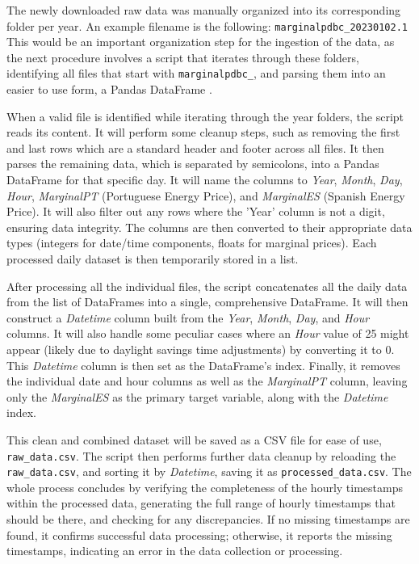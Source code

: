 \documentclass[12pt]{report} %
\begin{document}
The newly downloaded raw data was manually organized into its corresponding folder per year. An example filename is the following: \small{\verb|marginalpdbc_20230102.1|} This would be an important organization step for the ingestion of the data, as the next procedure involves a script that iterates through these folders, identifying all files that start with \small{\verb|marginalpdbc_|}, and parsing them into an easier to use form, a Pandas DataFrame \cite{dataframe}.

When a valid file is identified while iterating through the year folders, the script reads its content. It will perform some cleanup steps, such as removing the first and last rows which are a standard header and footer across all files. It then parses the remaining data, which is separated by semicolons, into a Pandas DataFrame for that specific day. It will name the columns to \textit{Year}, \textit{Month}, \textit{Day}, \textit{Hour}, \textit{MarginalPT} (Portuguese Energy Price), and \textit{MarginalES} (Spanish Energy Price). It will also filter out any rows where the 'Year' column is not a digit, ensuring data integrity. The columns are then converted to their appropriate data types (integers for date/time components, floats for marginal prices). Each processed daily dataset is then temporarily stored in a list.

After processing all the individual files, the script concatenates all the daily data from the list of DataFrames into a single, comprehensive DataFrame. It will then construct a \textit{Datetime} column built from the \textit{Year}, \textit{Month}, \textit{Day}, and \textit{Hour} columns. It will also handle some peculiar cases where an \textit{Hour} value of 25 might appear (likely due to daylight savings time adjustments) by converting it to 0. This \textit{Datetime} column is then set as the DataFrame's index. Finally, it removes the individual date and hour columns as well as the \textit{MarginalPT} column, leaving only the \textit{MarginalES} as the primary target variable, along with the \textit{Datetime} index.

This clean and combined dataset will be saved as a CSV file for ease of use, \small{\verb|raw_data.csv|}. The script then performs further data cleanup by reloading the \small{\verb|raw_data.csv|}, and sorting it by \textit{Datetime}, saving it as \small{\verb|processed_data.csv|}. The whole process concludes by verifying the completeness of the hourly timestamps within the processed data, generating the full range of hourly timestamps that should be there, and checking for any discrepancies. If no missing timestamps are found, it confirms successful data processing; otherwise, it reports the missing timestamps, indicating an error in the data collection or processing.
\end{document}
